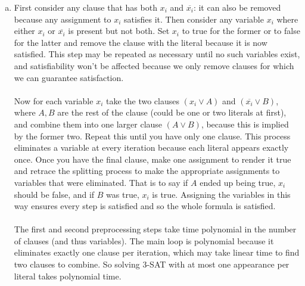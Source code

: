 \documentclass[11pt]{article}
\begin{document}
\begin{enumerate}[(a)]
\item First consider any clause that has both $x_i$ and $\overline{x_i}$: it can also be removed because any assignment to $x_i$ satisfies it. Then consider any variable $x_i$ where either $x_i$ or $\overline{x_i}$ is present but not both. Set $x_i$ to true for the former or to false for the latter and remove the clause with the literal because it is now satisfied. This step may be repeated as necessary until no such variables exist, and satisfiability won't be affected because we only remove clauses for which we can guarantee satisfaction. \\\\
Now for each variable $x_i$ take the two clauses $(x_i \vee A)$ and $(\overline{x_i} \vee B)$, where $A,B$ are the rest of the clause (could be one or two literals at first), and combine them into one larger clause $(A \vee B)$, because this is implied by the former two. Repeat this until you have only one clause. This process eliminates a variable at every iteration because each literal appears exactly once. Once you have the final clause, make one assignment to render it true and retrace the splitting process to make the appropriate assignments to variables that were eliminated. That is to say if $A$ ended up being true, $x_i$ should be false, and if $B$ was true, $x_i$ is true. Assigning the variables in this way ensures every step is satisfied and so the whole formula is satisfied. \\\\
The first and second preprocessing steps take time polynomial in the number of clauses (and thus variables). The main loop is polynomial because it eliminates exactly one clause per iteration, which may take linear time to find two clauses to combine. So solving 3-SAT with at most one appearance per literal takes polynomial time.

\end{enumerate}
\end{document}

